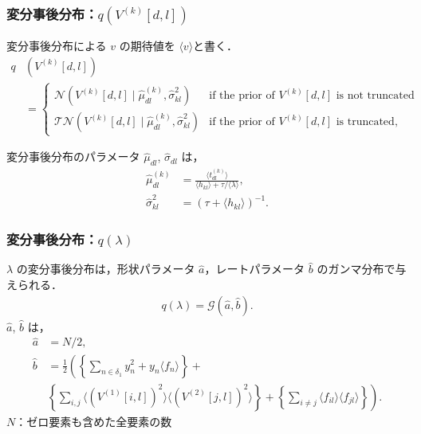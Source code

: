 \documentclass[dvipdfmx, dvipsnames]{beamer}
\begin{document}
\begin{frame}
\frametitle{変分事後分布：$q(V^{(k)}[d,l])$}

変分事後分布による $v$ の期待値を $\langle v \rangle$と書く．
\begin{align*}
q&(V^{(k)}[d,l])\\
&= \begin{cases}
\mathcal{N}(V^{(k)}[d,l] \mid \hat{\mu}_{dl}^{(k)} , \hat{\sigma}_{kl}^2) & \mbox{if the prior of $V^{(k)}[d,l]$ is not truncated} \\
\mathcal{TN}(V^{(k)}[d,l] \mid \hat{\mu}_{dl}^{(k)}, \hat{\sigma}_{kl}^2) & \mbox{if the prior of $V^{(k)}[d,l]$ is truncated},     
\end{cases} \label{qv}
\end{align*}

変分事後分布のパラメータ $\hat{\mu}_{dl}$, $\hat{\sigma}_{dl}$ は，
\begin{align*}
\hat{\mu}_{dl}^{(k)} &=\frac{\langle t_{dl}^{(k)} \rangle}{\langle h_{kl}\rangle+\tau/\langle\lambda\rangle},\\
\hat{\sigma}_{kl}^2 &=\left(\tau + \langle h_{kl} \rangle \right)^{-1}.
\end{align*}
\end{frame}

\begin{frame}
\frametitle{変分事後分布：$q(\lambda)$}
$\lambda$ の変分事後分布は，形状パラメータ $\hat a$，レートパラメータ $\hat b$ のガンマ分布で与えられる．
\begin{align*}
 q(\lambda) = \mathcal{G}(\hat a, \hat b ). 
\end{align*}
$\hat a$, $\hat b$ は，
\begin{align*}
\hat{a} &= N/2 ,\\
\hat{b} &= \frac{1}{2} \left( \left\{ \sum_{n \in \delta_1} y_n^2 +y_n \langle f_n \rangle \right\} + \right .\\
&\left. \left\{ \sum_{i ,j} \langle (V^{(1)}[i,l])^2 \rangle \langle (V^{(2)}[j,l]) ^2\rangle \right\}  + \left\{\sum_{i \neq j} \langle f_{il}\rangle \langle f_{jl} \rangle \right\}\right). 
\end{align*}
$N$：ゼロ要素も含めた全要素の数
\end{frame}
\end{document}
